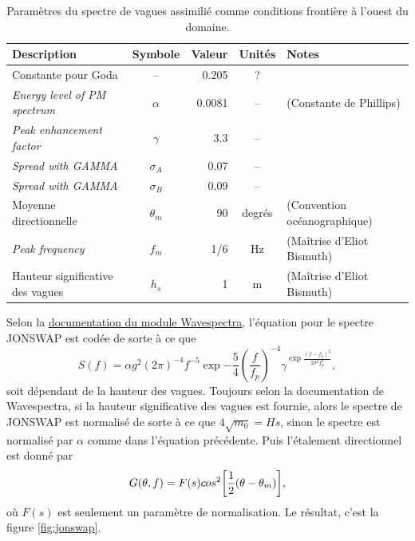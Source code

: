 \documentclass[10pt]{article}
\numberwithin{equation}{section}
\begin{document}
\begin{table}[htbp]
\caption{\label{tab:org106a1e3}Paramètres du spectre de vagues assimilié comme conditions frontière à l'ouest du domaine.}
\centering
\begin{tabular}{lcrcl}
\hline
\hline
Description & Symbole & Valeur & Unités & Notes\\
\hline
Constante pour Goda & -- & 0.205 & ? & \Textcite{goda1988variablity}\\
\emph{Energy level of PM spectrum} & \(\alpha\) & 0.0081 & -- & \Textcite{wwiii2016user} (Constante de Phillips)\\
\emph{Peak enhancement factor} & \(\gamma\) & 3.3 & -- & \Textcite{hasselmann1973measurements,wwiii2016user}\\
\emph{Spread with GAMMA} & \(\sigma_A\) & 0.07 & -- & \Textcite{hasselmann1973measurements,wwiii2016user}\\
\emph{Spread with GAMMA} & \(\sigma_B\) & 0.09 & -- & \Textcite{hasselmann1973measurements,wwiii2016user}\\
Moyenne directionnelle & \(\theta_m\) & 90 & degrés & \Textcite{wwiii2016user} (Convention océanographique)\\
\hline
\emph{Peak frequency} & \(f_m\) & 1/6 & Hz & (Maîtrise d'Eliot Bismuth)\\
Hauteur significative des vagues & \(h_s\) & 1 & m & (Maîtrise d'Eliot Bismuth)\\
\hline
\end{tabular}
\end{table}


Selon la \href{https://wavespectra.readthedocs.io/en/latest/construction.html\#jonswap}{documentation du module Wavespectra}, l'équation pour le spectre JONSWAP \autocite{hasselmann1973measurements} est codée de sorte à ce que 
\begin{equation}
   S(f) = \alpha g^2 (2\pi)^{-4} f^{-5} \exp{-\frac{5}{4} \left (\frac{f}{f_p} \right)^{-4} } \gamma^{\exp{\frac{(f-f_p)^2}{2\sigma^2f_p^2}}},
\end{equation}
soit dépendant de la hauteur des vagues. Toujours selon la documentation de Wavespectra, si la hauteur significative des vagues est fournie, alors le spectre de JONSWAP est normalisé de sorte à ce que \(4\sqrt{m_0} = Hs\), sinon le spectre est normalisé par \(\alpha\) comme dans l'équation précédente.
Puis l'étalement directionnel est donné par
\begin{equation}
   G(\theta,f)=F(s)cos^2\qty[\frac{1}{2}(\theta-\theta_{m})],
\end{equation}
où \(F(s)\) est seulement un paramètre de normalisation. Le résultat, c'est la figure \ref{fig:jonswap}.
\end{document}
